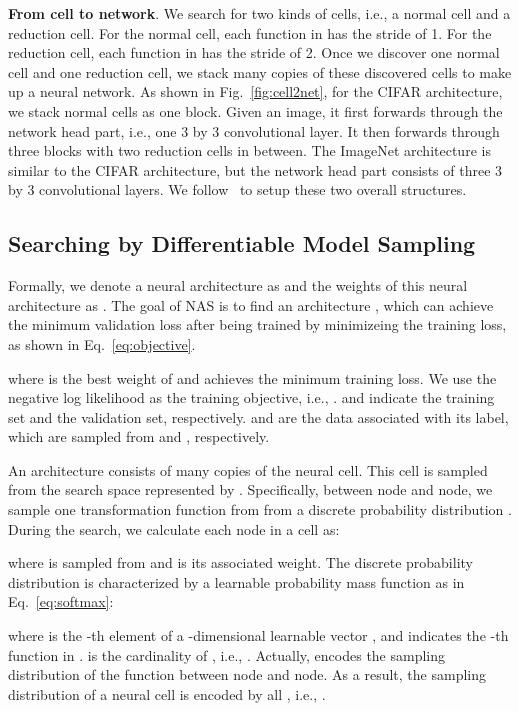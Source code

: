 \documentclass[10pt,twocolumn,letterpaper]{article}
\def\Figref#1{Fig.~\ref{#1}}
\def\Eqref#1{Eq.~\eqref{#1}}
\begin{document}
\textbf{From cell to network}.
We search for two kinds of cells, i.e., a normal cell and a reduction cell.
For the normal cell, each function in  has the stride of 1.
For the reduction cell, each function in  has the stride of 2.
Once we discover one normal cell and one reduction cell, we stack many copies of these discovered cells to make up a neural network.
As shown in \Figref{fig:cell2net}, for the CIFAR architecture, we stack  normal cells as one block.
Given an image, it first forwards through the network head part, i.e., one 3 by 3 convolutional layer.
It then forwards through three blocks with two reduction cells in between. The ImageNet architecture is similar to the CIFAR architecture, but the network head part consists of three 3 by 3 convolutional layers.
We follow~\cite{liu2019darts} to setup these two overall structures.






\subsection{Searching by Differentiable Model Sampling}\label{sec:method-sample}

Formally, we denote a neural architecture as  and the weights of this neural architecture as .
The goal of NAS is to find an architecture , which can achieve the minimum validation loss after being trained by minimizeing the training loss, as shown in \Eqref{eq:objective}.

\noindent where  is the best weight of  and achieves the minimum training loss.
We use the negative log likelihood as the training objective, i.e., .
 and  indicate the training set and the validation set, respectively.
 and  are the data associated with its label, which are sampled from  and , respectively.




An architecture  consists of many copies of the neural cell.
This cell is sampled from the search space represented by .
Specifically, between node and node, we sample one transformation function from  from a discrete probability distribution .
During the search, we calculate each node in a cell as:

\noindent where  is sampled from  and  is its associated weight.
The discrete probability distribution  is characterized by a learnable probability mass function as in \Eqref{eq:softmax}:

\noindent where  is the -th element of a -dimensional learnable vector , and  indicates the -th function in .
 is the cardinality of , i.e., .
Actually,  encodes the sampling distribution of the function between node and node.
As a result, the sampling distribution of a neural cell is encoded by all , i.e., .
\end{document}
